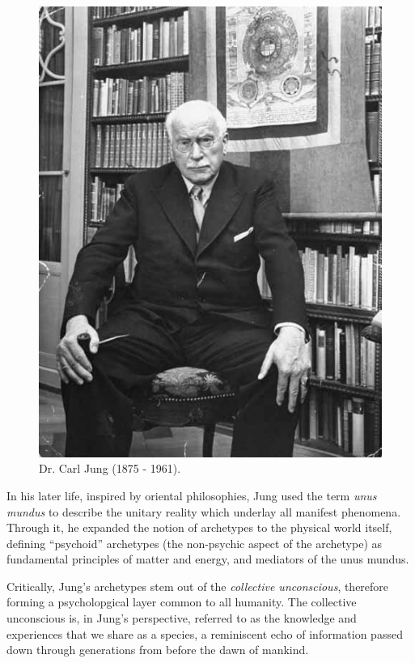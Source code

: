\documentclass[]{book}
\begin{document}
\begin{figure}

{\centering \includegraphics[width=\textwidth]{img/jung} 

}

\caption{Dr. Carl Jung (1875 - 1961).}\label{fig:unnamed-chunk-3}
\end{figure}

In his later life, inspired by oriental philosophies, Jung used the term \emph{unus mundus} to describe the unitary reality which underlay all manifest phenomena. Through it, he expanded the notion of archetypes to the physical world itself, defining ``psychoid'' archetypes (the non-psychic aspect of the archetype) as fundamental principles of matter and energy, and mediators of the unus mundus.

Critically, Jung's archetypes stem out of the \emph{collective unconscious}, therefore forming a psycholopgical layer common to all humanity. The collective unconscious is, in Jung's perspective, referred to as the knowledge and experiences that we share as a species, a reminiscent echo of information passed down through generations from before the dawn of mankind.
\end{document}
